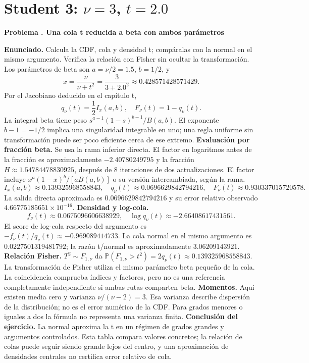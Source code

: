 \documentclass[11pt,a4paper]{article}
\newcommand{\Prob}{\mathbb P}
\theoremstyle{definition}
\newcounter{problema}
\newenvironment{resuelto}[1]{\refstepcounter{problema}\par\medskip\Needspace{6\baselineskip}\textbf{Problema \theproblema. #1}\par}{\par\medskip}
\begin{document}
\section{\texorpdfstring{Student 3: $\nu=3$, $t=2.0$}{Student 3: nu=3, t=2.0}}
\begin{resuelto}{Una cola t reducida a beta con ambos parámetros}
\textbf{Enunciado.} Calcula la CDF, cola y densidad t; compáralas con la normal en el mismo argumento. Verifica la relación con Fisher sin ocultar la transformación.
Los parámetros de beta son $a=\nu/2=1.5$, $b=1/2$, y
\[
x=\frac{\nu}{\nu+t^2}=\frac{3}{3+2.0^2}\approx0.428571428571429.
\]
Por el Jacobiano deducido en el capítulo t,
\[
q_\nu(t)=\frac12 I_x(a,b),\quad F_\nu(t)=1-q_\nu(t).
\]
La integral beta tiene peso $s^{a-1}(1-s)^{b-1}/B(a,b)$. El exponente $b-1=-1/2$ implica una singularidad integrable en uno; una regla uniforme sin transformación puede ser poco eficiente cerca de ese extremo.
\textbf{Evaluación por fracción beta.} Se usa la rama inferior directa. El factor en logaritmos antes de la fracción es aproximadamente $-2.40780249795$ y la fracción $H\approx1.54784478830925$, después de 8 iteraciones de dos actualizaciones. El factor incluye $x^a(1-x)^b/[aB(a,b)]$ o su versión intercambiada, según la rama.
\[
I_x(a,b)\approx0.139325968558843,\quad q_\nu(t)\approx0.0696629842794216,\quad F_\nu(t)\approx0.930337015720578.
\]
La salida directa aproximada es $0.0696629842794216$ y su error relativo observado $4.66775185651\times10^{-16}$.
\textbf{Densidad y log-cola.}
\[
f_\nu(t)\approx0.0675096606638929,\quad
\log q_\nu(t)\approx-2.66408617431561.
\]
El score de log-cola respecto del argumento es $-f_\nu(t)/q_\nu(t)\approx-0.969089414733$. La cola normal en el mismo argumento es $0.0227501319481792$; la razón t/normal es aproximadamente $3.06209143921$.
\textbf{Relación Fisher.} $T^2\sim F_{1,\nu}$ da $\Prob(F_{1,\nu}>t^2)=2q_\nu(t)\approx0.139325968558843$. La transformación de Fisher utiliza el mismo parámetro beta pequeño de la cola. La coincidencia comprueba índices y factores, pero no es una referencia completamente independiente si ambas rutas comparten beta.
\textbf{Momentos.} Aquí existen media cero y varianza $\nu/(\nu-2)=3$. Esa varianza describe dispersión de la distribución; no es el error numérico de la CDF. Para grados menores o iguales a dos la fórmula no representa una varianza finita.
\textbf{Conclusión del ejercicio.} La normal aproxima la t en un régimen de grados grandes y argumentos controlados. Esta tabla compara valores concretos; la relación de colas puede seguir siendo grande lejos del centro, y una aproximación de densidades centrales no certifica error relativo de cola.
\end{resuelto}
\end{document}
